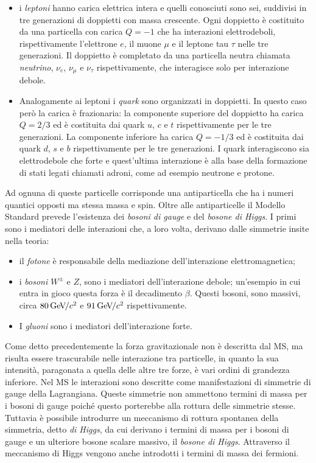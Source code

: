 \begin{itemize}
\item i {\em leptoni} hanno carica elettrica intera e quelli conosciuti sono sei, suddivisi in tre generazioni di doppietti con massa crescente. Ogni doppietto è costituito da una particella con carica $Q=-1$ che ha interazioni elettrodeboli, rispettivamente l'elettrone $e$, il muone $\mu$ e il leptone tau $\tau$ nelle tre generazioni. Il doppietto \`e completato da una particella neutra chiamata {\em neutrino}, $\nu_e$, $\nu_{\mu}$ e $\nu_{\tau}$ rispettivamente, che interagisce solo per interazione debole.
\item Analogamente ai leptoni i {\em quark} sono organizzati in doppietti. In questo caso però la carica è frazionaria: la componente superiore del doppietto ha carica $Q=2/3$ ed \`e costituita dai quark $u$, $c$ e $t$ rispettivamente per le tre generazioni. La componente inferiore ha carica $Q=-1/3$ ed \`e costituita dai quark $d$, $s$ e $b$ rispettivamente per le tre generazioni. I quark interagiscono sia elettrodebole che forte e quest'ultima interazione è alla base della formazione di stati legati chiamati adroni, come ad esempio neutrone e protone.
\end{itemize}

Ad ognuna di queste particelle corrisponde una antiparticella che ha i numeri quantici opposti ma stessa massa e spin. Oltre alle antiparticelle il Modello Standard prevede l'esistenza dei {\em bosoni di gauge} e del {\em bosone di Higgs}. I primi sono i mediatori delle interazioni che, a loro volta, derivano dalle simmetrie insite nella teoria:

\begin{itemize}
\item il {\em fotone} \`e responsabile della mediazione dell'interazione elettromagnetica;
\item i {\em bosoni $W^{\pm}$} e $Z$, sono i mediatori dell'interazione debole; un'esempio in cui entra in gioco questa forza è il decadimento $\beta$. Questi bosoni, sono massivi, circa $80{\rm \, Ge\kern-0.125em V}\kern-0.125em /c^2$ e $91{\rm \, Ge\kern-0.125em V}\kern-0.125em /c^2$ rispettivamente.
\item I {\em gluoni} sono i mediatori dell'interazione forte.
\end{itemize}

Come detto precedentemente la forza gravitazionale non è descritta dal MS, ma risulta essere trascurabile nelle interazione tra particelle, in quanto la sua intensità, paragonata a quella delle altre tre forze, è vari ordini di grandezza inferiore. Nel MS le interazioni sono descritte come manifestazioni di simmetrie di gauge della Lagrangiana. Queste simmetrie non ammettono termini di massa per i bosoni di gauge poiché questo porterebbe alla rottura delle simmetrie stesse. Tuttavia \`e possibile introdurre un meccanismo di rottura spontanea della simmetria, detto {\em di Higgs}, da cui derivano i termini di massa per i bosoni di gauge e un ulteriore bosone scalare massivo, il {\em bosone di Higgs}. Attraverso il meccanismo di Higgs vengono anche introdotti i termini di massa dei fermioni.

